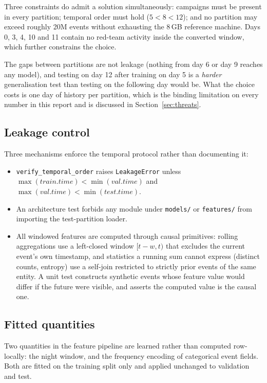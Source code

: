 \documentclass[11pt,a4paper]{article}
\begin{document}
Three constraints do admit a solution simultaneously: campaigns must be present
in every partition; temporal order must hold ($5 < 8 < 12$); and no partition may
exceed roughly 20M events without exhausting the 8\,GB reference machine.
Days 0, 3, 4, 10 and 11 contain no red-team activity inside the converted window,
which further constrains the choice.

The gaps between partitions are not leakage (nothing from day 6 or day 9
reaches any model), and testing on day 12 after training on day 5 is a
\emph{harder} generalisation test than testing on the following day would be.
What the choice costs is one day of history per partition, which is the binding
limitation on every number in this report and is discussed in
Section~\ref{sec:threats}.

\subsection{Leakage control}

Three mechanisms enforce the temporal protocol rather than documenting it:

\begin{itemize}
  \item \texttt{verify\_temporal\_order} raises \texttt{LeakageError} unless
  $\max(\textit{train.time}) < \min(\textit{val.time})$ and
  $\max(\textit{val.time}) < \min(\textit{test.time})$.

  \item An architecture test forbids any module under \texttt{models/} or
  \texttt{features/} from importing the test-partition loader.

  \item All windowed features are computed through causal primitives: rolling
  aggregations use a left-closed window $[t - w, t)$ that excludes the current
  event's own timestamp, and statistics a running sum cannot express (distinct
  counts, entropy) use a self-join restricted to strictly prior events of the
  same entity. A unit test constructs synthetic events whose feature value would
  differ if the future were visible, and asserts the computed value is the causal
  one.
\end{itemize}

\subsection{Fitted quantities}

Two quantities in the feature pipeline are learned rather than computed
row-locally: the night window, and the frequency encoding of categorical event
fields. Both are fitted on the training split only and applied unchanged to
validation and test.
\end{document}
